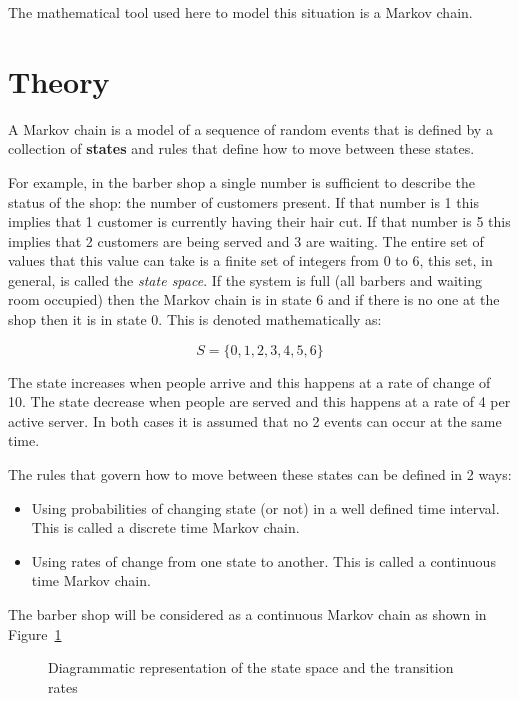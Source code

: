 The mathematical tool used here to model this situation is a Markov chain.

\section{Theory}\label{sec:markov_chains_theory}

A Markov chain is a model of a sequence of random events that is defined by a
collection of \textbf{states} and rules that define how to move between these
states.

For example, in the barber shop a single number is sufficient to describe the
status of the shop: the number of customers present.
If that number is 1 this implies that 1 customer is
currently having their hair cut. If that number is 5 this implies that 2
customers are being served and 3 are waiting. The entire set of values that this value can take
is
a finite set of integers from 0 to 6, this set, in general, is called the \textit{state space}.
If the system is full (all barbers
and waiting room occupied) then the Markov chain is in state 6 and if there is no one at the
shop then it is in state 0. This is denoted mathematically as:

\begin{equation}
    S = \{0, 1, 2, 3, 4, 5, 6\}
    \label{eqn:barber_shop_state_space}
\end{equation}

The state increases when people arrive and this happens at a rate of change of
10. The state decrease when people are served and this happens at a rate of 4
per active server. In both cases it is assumed that no 2 events can occur at
the same time.

The rules that govern how to move between these states can be defined in 2
ways:

\begin{itemize}
    \item Using probabilities of changing state (or not) in a well defined time
        interval. This is called a discrete time Markov chain.
    \item Using rates of change from one state to another. This is called a
        continuous time Markov chain.
\end{itemize}

The barber shop will be considered as a continuous Markov chain as shown
in Figure~\ref{fig:barber-shop-continuous-markov-process}

\begin{figure}[!hbtp]
    \begin{center}
    
    \end{center}
    \caption{Diagrammatic representation of the state space and the transition
    rates}
    \label{fig:barber-shop-continuous-markov-process}
\end{figure}

